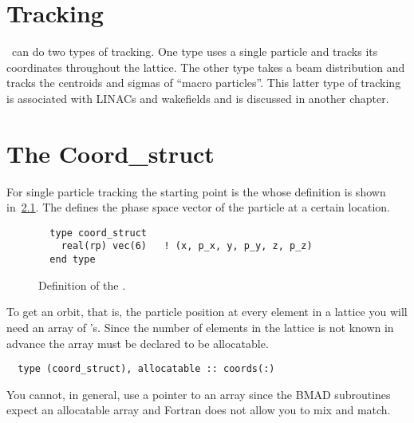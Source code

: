 \chapter{Tracking}
\label{s:tm}

\bmad\ can do two types of tracking. One type uses a single particle 
and tracks its coordinates throughout the lattice. The other type
takes a beam distribution and tracks the centroids and sigmas of
``macro particles''.  This latter type of tracking is associated with
LINACs and wakefields and is discussed in another chapter.

\chapter{The Coord\_struct}

For single particle tracking the starting point is the
 whose definition is shown
in~\ref{f:coord_struct}. The  defines the phase
space vector of the particle at a certain location.

\begin{figure}[tb]
\centering
\small
\begin{verbatim}
  type coord_struct
    real(rp) vec(6)   ! (x, p_x, y, p_y, z, p_z)
  end type
\end{verbatim}
\caption{Definition of the .}
\label{f:coord_struct}
\end{figure}

To get an orbit, that is, the particle position at every element in a lattice
you will need an array of 's. Since
the number of elements in the lattice is not known in advance the
array must be declared to be allocatable. 
\begin{verbatim}
  type (coord_struct), allocatable :: coords(:)
\end{verbatim}
You cannot, in general, use a pointer to an array since the BMAD
subroutines expect an allocatable array and Fortran does not allow you
to mix and match.

